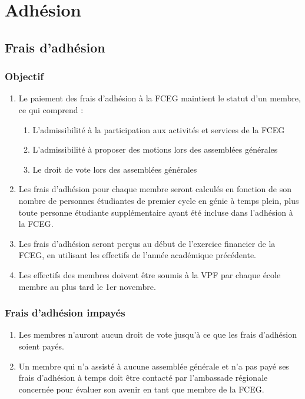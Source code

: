 \section{Adhésion}
\label{adhesion}

\subsection{Frais d'adhésion}
\label{adhesion-frais-d-adhesion}

\subsubsection{Objectif}
\label{frais-d-adhesion-objectif}

\begin{enumerate}
 \item Le paiement des frais d'adhésion à la FCEG maintient le statut d'un membre, ce qui comprend :
  \begin{enumerate}
   \item L'admissibilité à la participation aux activités et services de la FCEG
   \item L'admissibilité à proposer des motions lors des assemblées générales
   \item Le droit de vote lors des assemblées générales
  \end{enumerate}
 \item Les frais d'adhésion pour chaque membre seront calculés en fonction de son nombre de personnes étudiantes de premier cycle en génie à temps plein, plus toute personne étudiante supplémentaire ayant été incluse dans l'adhésion à la FCEG.
 \item Les frais d'adhésion seront perçus au début de l'exercice financier de la FCEG, en utilisant les effectifs de l'année académique précédente.
 \item Les effectifs des membres doivent être soumis à la VPF par chaque école membre au plus tard le 1er novembre.
\end{enumerate}

\subsubsection{Frais d'adhésion impayés}
\label{frais-d-adhesion-frais-d-adhesion-impayes}

\begin{enumerate}
 \item Les membres n'auront aucun droit de vote jusqu'à ce que les frais d'adhésion soient payés.
 \item Un membre qui n'a assisté à aucune assemblée générale et n'a pas payé ses frais d'adhésion à temps doit être contacté par l'ambassade régionale concernée pour évaluer son avenir en tant que membre de la FCEG.
\end{enumerate}

